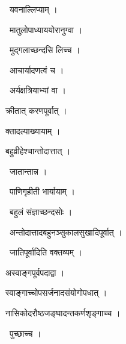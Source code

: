 \documentclass[10pt, openany, oneside]{book}
\begin{document}
\par\noindent\hspace{1.5em}{\vps वा॰}~{\qt यवनाल्लिप्याम् ।}

\par\noindent\hspace{1.5em}{\vps वा॰}~{\qt मातुलोपाध्याययोरानुग्वा ।}

\par\noindent\hspace{1.5em}{\vps वा॰}~{\qt मुद्गलाच्छन्दसि लिच्च ।}

\par\noindent\hspace{1.5em}{\vps वा॰}~{\qt आचार्यादणत्वं च ।}

\par\noindent\hspace{1.5em}{\vps वा॰}~{\qt अर्यक्षत्रियाभ्यां वा ।}

\noindent क्रीतात् करणपूर्वात् ।

\noindent क्तादल्पाख्यायाम् ।

\noindent बहुव्रीहेश्चान्तोदात्तात् ।

\par\noindent\hspace{1.5em}{\vps वा॰}~{\qt जातान्तान्न ।}

\par\noindent\hspace{1.5em}{\vps वा॰}~{\qt पाणिगृहीती भार्यायाम् ।}

\par\noindent\hspace{1.5em}{\vps वा॰}~{\qt बहुलं संज्ञाच्छन्दसोः ।}

\par\noindent\hspace{1.5em}{\vps वा॰}~{\qt अन्तोदात्तादबहुनञ्सुकालसुखादिपूर्वात् ।}

\par\noindent\hspace{1.5em}{\vps वा॰}~{\qt जातिपूर्वादिति वक्तव्यम् ।}

\noindent अस्वाङ्गपूर्वपदाद्वा ।

\noindent स्वाङ्गाच्चोपसर्जनादसंयोगोपधात् ।

\noindent नासिकोदरौष्ठजङ्घादन्तकर्णश‍ृङ्गाच्च ।

\par\noindent\hspace{1.5em}{\vps वा॰}~{\qt पुच्छाच्च ।}
\end{document}
